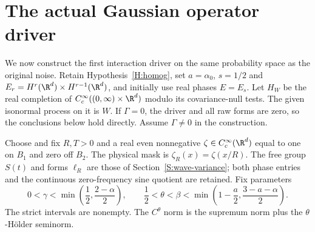 \section{The actual Gaussian operator driver}
\label{S:actual-operator-driver}

We now construct the first interaction driver on the same probability
space as the original noise. Retain Hypothesis~\ref{H:homog}, set
$a=\alpha_0$, $s=1/2$ and $E_r=H^r(\R^d)\times H^{r-1}(\R^d)$,
and initially use real phases $E=E_s$. Let $H_W$ be the real completion
of $C_c^\infty((0,\infty)\times\R^d)$ modulo its covariance-null tests.
The given isonormal process on it is $W$. If $\Gamma=0$, the driver and
all raw forms are zero, so the conclusions below hold directly. Assume
$\Gamma\ne0$ in the construction.

Choose and fix $R,T>0$ and a real even nonnegative
$\zeta\in C_c^\infty(\R^d)$ equal to one on $B_1$ and zero off $B_2$.
The physical mask is $\zeta_R(x)=\zeta(x/R)$. The free group $S(t)$ and
forms $\ell_R$ are those of Section~\ref{S:wave-variance}; both phase
entries and the continuous zero-frequency sine quotient are retained.
Fix parameters
\begin{equation}\label{E:driver-parameters}
  0<\gamma<\min\left(\frac12,\frac{2-\alpha}{2}\right),\qquad
  \frac12<\theta<\beta<\min\left(1-\frac a2,
  \frac{3-a-\alpha}{2}\right).
\end{equation}
The strict intervals are nonempty. The $C^\theta$ norm is the supremum
norm plus the $\theta$-H\"older seminorm.

